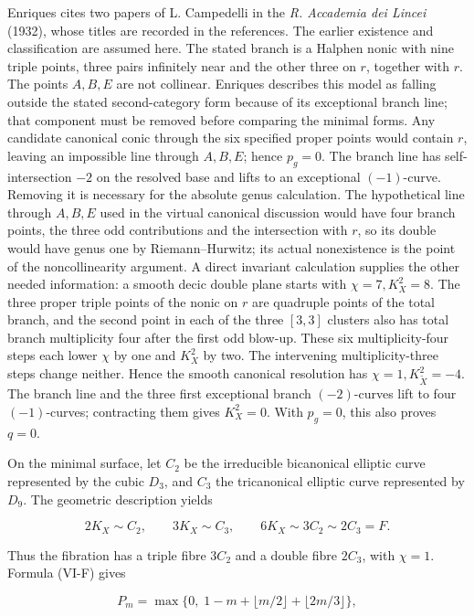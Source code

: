 Enriques cites two papers of L. Campedelli in the \emph{R. Accademia dei Lincei} (1932), whose titles are recorded in the references. The earlier existence and classification are assumed here. The stated branch is a Halphen nonic with nine triple points, three pairs infinitely near and the other three on \(r\), together with \(r\). The points \(A,B,E\) are not collinear. Enriques describes this model as falling outside the stated second-category form because of its exceptional branch line; that component must be removed before comparing the minimal forms. Any candidate canonical conic through the six specified proper points would contain \(r\), leaving an impossible line through \(A,B,E\); hence \(p_g=0\). The branch line has self-intersection \(-2\) on the resolved base and lifts to an exceptional \((-1)\)-curve. Removing it is necessary for the absolute genus calculation. The hypothetical line through \(A,B,E\) used in the virtual canonical discussion would have four branch points, the three odd contributions and the intersection with \(r\), so its double would have genus one by Riemann--Hurwitz; its actual nonexistence is the point of the noncollinearity argument. A direct invariant calculation supplies the other needed information: a smooth decic double plane starts with \(\chi=7,K_X^2=8\). The three proper triple points of the nonic on \(r\) are quadruple points of the total branch, and the second point in each of the three \([3,3]\) clusters also has total branch multiplicity four after the first odd blow-up. These six multiplicity-four steps each lower \(\chi\) by one and \(K_X^2\) by two. The intervening multiplicity-three steps change neither. Hence the smooth canonical resolution has \(\chi=1,K_{\widetilde X}^2=-4\). The branch line and the three first exceptional branch \((-2)\)-curves lift to four \((-1)\)-curves; contracting them gives \(K_X^2=0\). With \(p_g=0\), this also proves \(q=0\).

On the minimal surface, let \(C_2\) be the irreducible bicanonical elliptic curve represented by the cubic \(D_3\), and \(C_3\) the tricanonical elliptic curve represented by \(D_9\). The geometric description yields

\[
2K_X\sim C_2,\qquad3K_X\sim C_3,\qquad
6K_X\sim3C_2\sim2C_3=F.
\]

Thus the fibration has a triple fibre \(3C_2\) and a double fibre \(2C_3\), with \(\chi=1\). Formula (VI-F) gives

\[
P_m=\max\{0,\;1-m+\lfloor m/2\rfloor+\lfloor2m/3\rfloor\},
\]

